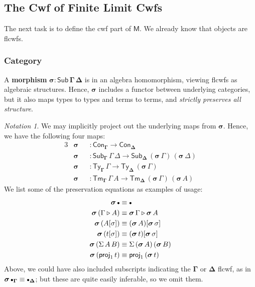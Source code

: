 \documentclass[12pt,a4paper,twoside,openany]{book}
\theoremstyle{remark}
\newtheorem{notation}{Notation}
\theoremstyle{definition}
\theoremstyle{theorem}
\newcommand{\Con}{\mathsf{Con}}
\newcommand{\Sub}{\mathsf{Sub}}
\newcommand{\Tm}{\mathsf{Tm}}
\newcommand{\Ty}{\mathsf{Ty}}
\newcommand{\proj}{\mathsf{proj}}
\newcommand{\ext}{\triangleright}
\newcommand{\emptycon}{\scaleobj{.75}\bullet}
\newcommand{\bSub}{\boldsymbol{\Sub}}
\newcommand{\bGamma}{\boldsymbol{\Gamma}}
\newcommand{\bDelta}{\boldsymbol{\Delta}}
\newcommand{\bsigma}{\boldsymbol{\sigma}}
\newcommand{\bM}{\boldsymbol{\mathsf{M}}}
\begin{document}
\subsection{The Cwf of Finite Limit Cwfs}

The next task is to define the cwf part of $\bM$. We already know that objects
are flcwfs.

\subsubsection{Category}

A \textbf{morphism} $\bsigma : \bSub\,\bGamma\,\bDelta$ is in an algebra
homomorphism, viewing flcwfs as algebraic structures. Hence, $\bsigma$ includes
a functor between underlying categories, but it also maps types to types and
terms to terms, and \emph{strictly preserves all structure}.

\begin{notation}
We may implicitly project out the underlying maps from $\bsigma$. Hence, we
have the following four maps:
\begin{alignat*}{3}
  & \bsigma &&: \Con_{\bGamma} \to \Con_{\bDelta} \\
  & \bsigma &&: \Sub_{\bGamma}\,\Gamma\,\Delta \to \Sub_{\bDelta}\,(\bsigma\,\Gamma)\,(\bsigma\,\Delta)\\
  & \bsigma &&: \Ty_{\bGamma}\,\Gamma \to \Ty_{\bDelta}\,(\bsigma\,\Gamma)\\
  & \bsigma &&: \Tm_{\bGamma}\,\Gamma\,A \to \Tm_{\bDelta}\,(\bsigma\,\Gamma)\,(\bsigma\,A)
\end{alignat*}
We list some of the preservation equations as examples of usage:
\begin{alignat*}{3}
  \bsigma\,\emptycon &\equiv \emptycon \\
  \bsigma\,(\Gamma \ext A) &\equiv \bsigma\,\Gamma \ext \bsigma\,A\\
  \bsigma\,(A[\sigma]) &\equiv (\bsigma\,A)[\bsigma\,\sigma]\\
  \bsigma\,(t[\sigma]) &\equiv (\bsigma\,t)[\bsigma\,\sigma]\\
  \bsigma\,(\Sigma\,A\,B) &\equiv \Sigma\,(\bsigma\,A)\,(\bsigma\,B)\\
  \bsigma\,(\proj_1\,t) &\equiv \proj_1\,(\bsigma\,t)
\end{alignat*}
Above, we could have also included subscripts indicating the $\bGamma$ or
$\bDelta$ flcwf, as in $\bsigma\,\emptycon_{\bGamma} \equiv
\emptycon_{\bDelta}$; but these are quite easily inferable, so we omit them.
\end{notation}
\end{document}

